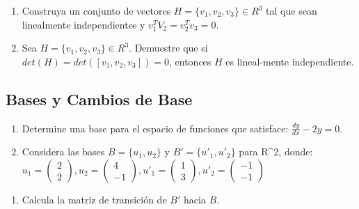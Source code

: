 \documentclass[
  11,
]{article}
\providecommand{\tightlist}{%
  \setlength{\itemsep}{0pt}\setlength{\parskip}{0pt}}
\begin{document}
\begin{enumerate}
\def\labelenumi{\arabic{enumi}.}
\setcounter{enumi}{3}
\item
  Construya un conjunto de vectores \(H = \{v_1, v_2, v_3\} \in R^3\)
  tal que sean linealmente independientes y \(v_1^TV_2 = v_2^Tv_3 = 0\).
\item
  Sea \(H = \{v_1, v_2, v_3\} \in R^3\). Demuestre que si
  \(det(H) = det( [v_1, v_2, v_3] ) = 0\), entonces \(H\) es
  lineal-mente independiente.
\end{enumerate}

\hypertarget{bases-y-cambios-de-base}{%
\subsection{Bases y Cambios de Base}\label{bases-y-cambios-de-base}}

\begin{enumerate}
\def\labelenumi{\arabic{enumi}.}
\item
  Determine una base para el espacio de funciones que satisface:
  \(\frac{dy}{dx}-2y=0\).
\item
  Considera las bases \(B = \{u_1,u_2\}\) y \(B' = \{u'_1,u'_2\}\) para
  R\^{}2, donde:
  \(u_1 = \begin{pmatrix}2\\2\end{pmatrix}, u_2 = \begin{pmatrix}4\\-1\end{pmatrix}, u'_1 = \begin{pmatrix}1\\3\end{pmatrix}, u'_2 = \begin{pmatrix}-1\\-1\end{pmatrix}\)
\end{enumerate}

\begin{enumerate}
\def\labelenumi{\alph{enumi})}
\tightlist
\item
  Calcula la matriz de transición de \(B'\) hacia \(B\).
\end{enumerate}
\end{document}
